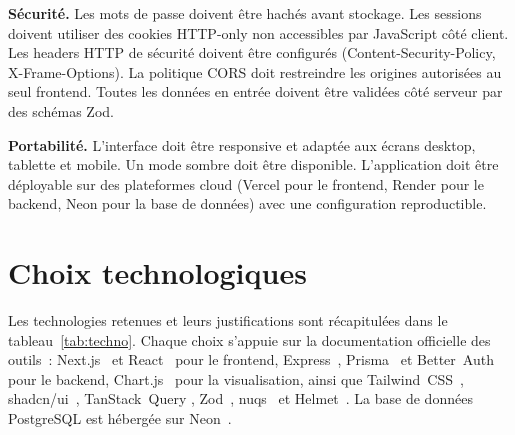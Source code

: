 \documentclass[11pt,a4paper]{report}
\begin{document}
\noindent\textbf{Sécurité.} Les mots de passe doivent être hachés avant
stockage. Les sessions doivent utiliser des cookies HTTP-only non accessibles
par JavaScript côté client. Les headers HTTP de sécurité doivent être configurés
(Content-Security-Policy, X-Frame-Options). La politique CORS doit restreindre
les origines autorisées au seul frontend. Toutes les données en entrée doivent
être validées côté serveur par des schémas Zod.

\noindent\textbf{Portabilité.} L'interface doit être responsive et adaptée aux
écrans desktop, tablette et mobile. Un mode sombre doit être disponible.
L'application doit être déployable sur des plateformes cloud (Vercel pour le
frontend, Render pour le backend, Neon pour la base de données) avec une
configuration reproductible.

\section{Choix technologiques}
Les technologies retenues et leurs justifications sont récapitulées dans le
tableau~\ref{tab:techno}. Chaque choix s'appuie sur la documentation officielle
des outils~: Next.js~\cite{nextjs} et React~\cite{react} pour le frontend,
Express~\cite{express}, Prisma~\cite{prisma} et Better~Auth~\cite{betterauth}
pour le backend, Chart.js~\cite{chartjs} pour la visualisation, ainsi que
Tailwind~CSS~\cite{tailwind}, shadcn/ui~\cite{shadcn}, TanStack~Query
\cite{tanstack}, Zod~\cite{zod}, nuqs~\cite{nuqs} et Helmet~\cite{helmet}. La
base de données PostgreSQL est hébergée sur Neon~\cite{neon}.
\end{document}
